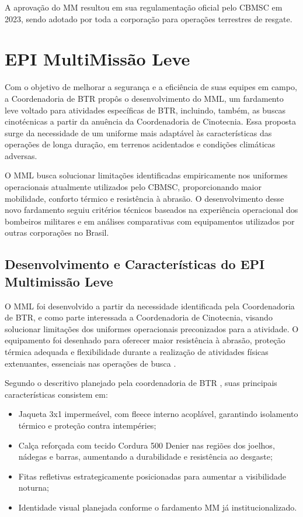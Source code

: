 A aprovação do \acrlong{MM} resultou em sua regulamentação oficial pelo \acrshort{CBMSC} em 2023, sendo adotado por toda a corporação para operações terrestres de resgate.

\section{EPI MultiMissão Leve}

Com o objetivo de melhorar a segurança e a eficiência de suas equipes em campo, a Coordenadoria de \acrlong{BTR} propôs o desenvolvimento do \acrfull{MML}, um fardamento leve voltado para atividades específicas de \acrlong{BTR}, incluindo, também, as buscas cinotécnicas a partir da anuência da Coordenadoria de Cinotecnia. Essa proposta surge da necessidade de um uniforme mais adaptável às características das operações de longa duração, em terrenos acidentados e condições climáticas adversas.

O \acrshort{MML} busca solucionar limitações identificadas empiricamente nos uniformes operacionais atualmente utilizados pelo \acrshort{CBMSC}, proporcionando maior mobilidade, conforto térmico e resistência à abrasão. O desenvolvimento desse novo fardamento seguiu critérios técnicos baseados na experiência operacional dos bombeiros militares e em análises comparativas com equipamentos utilizados por outras corporações no Brasil.

\subsection{Desenvolvimento e Características do EPI Multimissão Leve}
    O \acrlong{MML} foi desenvolvido a partir da necessidade identificada pela Coordenadoria de \acrshort{BTR}, e como parte interessada a Coordenadoria de Cinotecnia, visando solucionar limitações dos uniformes operacionais preconizados para a atividade. O equipamento foi desenhado para oferecer maior resistência à abrasão, proteção térmica adequada e flexibilidade durante a realização de atividades físicas extenuantes, essenciais nas operações de busca \cite{relMML}.

    Segundo o descritivo planejado pela coordenadoria de \acrlong{BTR} \cite{descritivoMML}, suas principais características consistem em:

\begin{itemize}
    \item Jaqueta 3x1 impermeável, com fleece interno acoplável, garantindo isolamento térmico e proteção contra intempéries;
    \item Calça reforçada com tecido Cordura 500 Denier nas regiões dos joelhos, nádegas e barras, aumentando a durabilidade e resistência ao desgaste;
    \item Fitas refletivas estrategicamente posicionadas para aumentar a visibilidade noturna;
    \item Identidade visual planejada conforme o fardamento \acrlong{MM} já institucionalizado.
\end{itemize}


